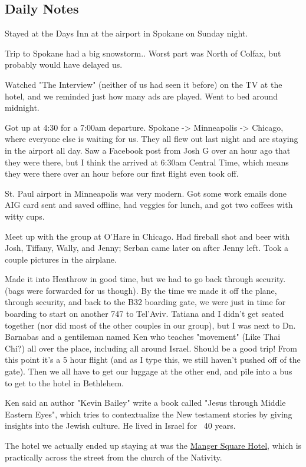 \documentclass[letterpaper]{report}
\begin{document}
\clearpage
\begin{multicols}{2}
\subsection{Daily Notes}
Stayed at the Days Inn at the airport  in Spokane on Sunday night.

Trip to Spokane had a big snowstorm.. Worst part was North of Colfax, but probably would have delayed us.

Watched "The Interview" (neither of us had seen it before) on the TV at the hotel, and we reminded just how many ads are played. Went to bed around midnight.

Got up at 4:30 for a 7:00am departure. Spokane -> Minneapolis -> Chicago, where everyone else is waiting for us. They all flew out last night and are staying in the airport all day. Saw a Facebook post from Josh G over an hour ago that they were there, but I think the arrived at 6:30am Central Time, which means they were there over an hour before our first flight even took off.

St. Paul airport in Minneapolis was very modern. Got some work emails done AIG card sent and saved offline, had veggies for lunch, and got two coffees with witty cups.

Meet up with the group at O'Hare in Chicago. Had fireball shot and beer with Josh, Tiffany, Wally, and Jenny; Serban came later on after Jenny left. Took a couple pictures in the airplane.

Made it into Heathrow in good time, but we had to go back through security.  (bags were forwarded for us though).
By the time we made it off the plane, through security, and back to the B32 boarding gate, we were just in time for boarding to start on another 747 to Tel'Aviv.  Tatiana and I didn't get seated together (nor did most of the other couples in our group), but I was next to Dn. Barnabas and a gentileman named Ken who teaches "movement" (Like Thai Chi?) all over the place, including all around Israel. Should be a good trip!   From this point it's a 5 hour flight (and as I type this, we still haven't pushed off of the gate).  Then we all have to get our luggage at the other end, and pile into a bus to get to the hotel in Bethlehem.

Ken said an author "Kevin Bailey" write a book called "Jesus through Middle Eastern Eyes", which tries to contextualize the New testament stories by giving insights into the Jewish culture. He lived in Israel for ~40 years.

The hotel we actually ended up staying at was the
\href{http://www.mangersquarehotel.com/}{
  Manger Square Hotel}, which is practically across the street from the church of the Nativity.
\end{multicols}
\end{document}

